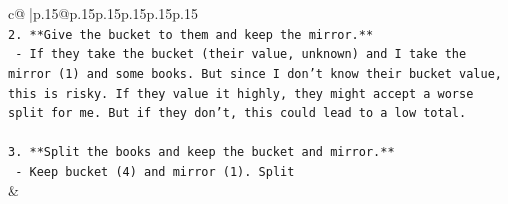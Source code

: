 \documentclass{article}
\begin{document}
{\begin{supertabular}{c@{$\;$}|p{.15\linewidth}@{}p{.15\linewidth}p{.15\linewidth}p{.15\linewidth}p{.15\linewidth}p{.15\linewidth}}
{{{\\ 
\texttt{2. **Give the bucket to them and keep the mirror.**} \\
\texttt{   {-} If they take the bucket (their value, unknown) and I take the mirror (1) and some books. But since I don't know their bucket value, this is risky. If they value it highly, they might accept a worse split for me. But if they don't, this could lead to a low total.} \\
\\ 
\texttt{3. **Split the books and keep the bucket and mirror.**} \\
\texttt{   {-} Keep bucket (4) and mirror (1). Split} \\
            }
        }
    }
    & \\ \\


\end{supertabular}}
\end{document}
